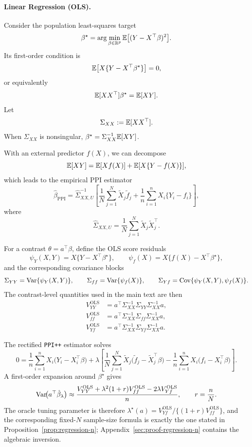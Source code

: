 \paragraph{Linear Regression (OLS).}
Consider the population least-squares target
\[
\beta^\star
=
\arg\min_{\beta\in\mathbb R^p}
\mathbb{E}\big[(Y-X^\top\beta)^2\big].
\]
Its first-order condition is
\[
\mathbb{E}\big[X\{Y-X^\top\beta^\star\}\big]=0,
\]
or equivalently
\[
\mathbb{E}[XX^\top]\beta^\star=\mathbb{E}[XY].
\]
Let
\[
\Sigma_{XX}:=\mathbb{E}[XX^\top].
\]
When $\Sigma_{XX}$ is nonsingular, $\beta^\star=\Sigma_{XX}^{-1}\mathbb{E}[XY]$.

With an external predictor $f(X)$, we can decompose
\[
\mathbb{E}[XY]
=
\mathbb{E}[Xf(X)] + \mathbb{E}[X\{Y-f(X)\}],
\]
which leads to the empirical PPI estimator
\[
\hat\beta_{\mathrm{PPI}}
=
\hat\Sigma_{XX,U}^{-1}
\left[
\frac{1}{N}\sum_{j=1}^N \tilde X_j\tilde f_j
+
\frac{1}{n}\sum_{i=1}^n X_i\{Y_i-f_i\}
\right],
\]
where
\[
\hat\Sigma_{XX,U}=\frac{1}{N}\sum_{j=1}^N \tilde X_j\tilde X_j^\top.
\]

For a contrast $\theta=a^\top\beta$, define the OLS score residuals
\[
\psi_Y(X,Y)=X\{Y-X^\top\beta^\star\},
\qquad
\psi_f(X)=X\{f(X)-X^\top\beta^\star\},
\]
and the corresponding covariance blocks
\[
\Sigma_{YY}=\mathrm{Var}\{\psi_Y(X,Y)\},
\qquad
\Sigma_{ff}=\mathrm{Var}\{\psi_f(X)\},
\qquad
\Sigma_{Yf}=\mathrm{Cov}\{\psi_Y(X,Y),\psi_f(X)\}.
\]
The contrast-level quantities used in the main text are then
\begin{align*}
V_{YY}^{\mathrm{OLS}}
&=
a^\top\Sigma_{XX}^{-1}\Sigma_{YY}\Sigma_{XX}^{-1}a, \\
V_{ff}^{\mathrm{OLS}}
&=
a^\top\Sigma_{XX}^{-1}\Sigma_{ff}\Sigma_{XX}^{-1}a, \\
V_{Yf}^{\mathrm{OLS}}
&=
a^\top\Sigma_{XX}^{-1}\Sigma_{Yf}\Sigma_{XX}^{-1}a.
\end{align*}

The rectified \texttt{PPI++} estimator solves
\[
0
=
\frac{1}{n}\sum_{i=1}^n X_i\big(Y_i-X_i^\top\beta\big)
+
\lambda\left[
\frac{1}{N}\sum_{j=1}^N \tilde X_j\big(\tilde f_j-\tilde X_j^\top\beta\big)
-
\frac{1}{n}\sum_{i=1}^n X_i\big(f_i-X_i^\top\beta\big)
\right].
\]
A first-order expansion around $\beta^\star$ gives
\[
\mathrm{Var}\!\big(a^\top\hat\beta_\lambda\big)
\approx
\frac{
V_{YY}^{\mathrm{OLS}}
+
\lambda^2(1+r)V_{ff}^{\mathrm{OLS}}
-2\lambda V_{Yf}^{\mathrm{OLS}}
}{n},
\qquad
r=\frac{n}{N}.
\]
The oracle tuning parameter is therefore
$\lambda^\star(a)=V_{Yf}^{\mathrm{OLS}}/\{(1+r)V_{ff}^{\mathrm{OLS}}\}$,
and the corresponding fixed-$N$ sample-size formula is exactly the one
stated in Proposition~\ref{prop:regression-n}; Appendix~\ref{sec:proof-regression-n}
contains the algebraic inversion.

